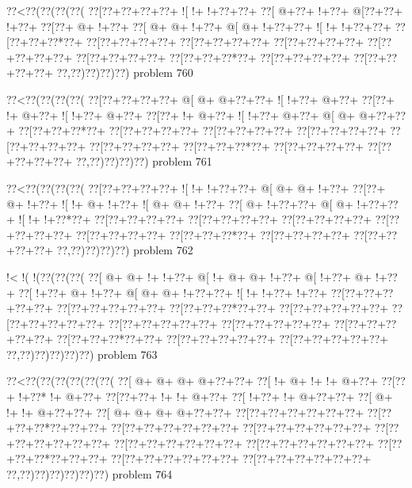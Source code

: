 \vbox{\vbox{\goo
\0??<\0??(\0??(\0??(\0??(
\0??[\0??+\0??+\0??+\0??+
\- ![\- !+\- !+\0??+\0??+
\0??[\- @+\0??+\- !+\0??+
\- @[\0??+\0??+\- !+\0??+
\0??[\0??+\- @+\- !+\0??+
\0??[\- @+\- @+\- !+\0??+
\- @[\- @+\- !+\0??+\0??+
\- ![\- !+\- !+\0??+\0??+
\0??[\0??+\0??+\0??*\0??+
\0??[\0??+\0??+\0??+\0??+
\0??[\0??+\0??+\0??+\0??+
\0??[\0??+\0??+\0??+\0??+
\0??[\0??+\0??+\0??+\0??+
\0??[\0??+\0??+\0??+\0??+
\0??[\0??+\0??+\0??*\0??+
\0??[\0??+\0??+\0??+\0??+
\0??[\0??+\0??+\0??+\0??+
\0??,\0??)\0??)\0??)\0??)
}
\hfil problem 760\hfil\break
}

\vbox{\vbox{\goo
\0??<\0??(\0??(\0??(\0??(
\0??[\0??+\0??+\0??+\0??+
\- @[\- @+\- @+\0??+\0??+
\- ![\- !+\0??+\- @+\0??+
\0??[\0??+\- !+\- @+\0??+
\- ![\- !+\0??+\- @+\0??+
\0??[\0??+\- !+\- @+\0??+
\- ![\- !+\0??+\- @+\0??+
\- @[\- @+\- @+\0??+\0??+
\0??[\0??+\0??+\0??*\0??+
\0??[\0??+\0??+\0??+\0??+
\0??[\0??+\0??+\0??+\0??+
\0??[\0??+\0??+\0??+\0??+
\0??[\0??+\0??+\0??+\0??+
\0??[\0??+\0??+\0??+\0??+
\0??[\0??+\0??+\0??*\0??+
\0??[\0??+\0??+\0??+\0??+
\0??[\0??+\0??+\0??+\0??+
\0??,\0??)\0??)\0??)\0??)
}
\hfil problem 761\hfil\break
}

\vbox{\vbox{\goo
\0??<\0??(\0??(\0??(\0??(
\0??[\0??+\0??+\0??+\0??+
\- ![\- !+\- !+\0??+\0??+
\- @[\- @+\- @+\- !+\0??+
\0??[\0??+\- @+\- !+\0??+
\- ![\- !+\- @+\- !+\0??+
\- ![\- @+\- @+\- !+\0??+
\0??[\- @+\- !+\0??+\0??+
\- @[\- @+\- !+\0??+\0??+
\- ![\- !+\- !+\0??*\0??+
\0??[\0??+\0??+\0??+\0??+
\0??[\0??+\0??+\0??+\0??+
\0??[\0??+\0??+\0??+\0??+
\0??[\0??+\0??+\0??+\0??+
\0??[\0??+\0??+\0??+\0??+
\0??[\0??+\0??+\0??*\0??+
\0??[\0??+\0??+\0??+\0??+
\0??[\0??+\0??+\0??+\0??+
\0??,\0??)\0??)\0??)\0??)
}
\hfil problem 762\hfil\break
}

\vbox{\vbox{\goo
\- !<\- !(\- !(\0??(\0??(\0??(
\0??[\- @+\- @+\- !+\- !+\0??+
\- @[\- !+\- @+\- @+\- !+\0??+
\- @[\- !+\0??+\- @+\- !+\0??+
\0??[\- !+\0??+\- @+\- !+\0??+
\- @[\- @+\- @+\- !+\0??+\0??+
\- ![\- !+\- !+\0??+\- !+\0??+
\0??[\0??+\0??+\0??+\0??+\0??+
\0??[\0??+\0??+\0??+\0??+\0??+
\0??[\0??+\0??+\0??*\0??+\0??+
\0??[\0??+\0??+\0??+\0??+\0??+
\0??[\0??+\0??+\0??+\0??+\0??+
\0??[\0??+\0??+\0??+\0??+\0??+
\0??[\0??+\0??+\0??+\0??+\0??+
\0??[\0??+\0??+\0??+\0??+\0??+
\0??[\0??+\0??+\0??*\0??+\0??+
\0??[\0??+\0??+\0??+\0??+\0??+
\0??[\0??+\0??+\0??+\0??+\0??+
\0??,\0??)\0??)\0??)\0??)\0??)
}
\hfil problem 763\hfil\break
}

\vbox{\vbox{\goo
\0??<\0??(\0??(\0??(\0??(\0??(\0??(
\0??[\- @+\- @+\- @+\- @+\0??+\0??+
\0??[\- !+\- @+\- !+\- !+\- @+\0??+
\0??[\0??+\- !+\0??*\- !+\- @+\0??+
\0??[\0??+\0??+\- !+\- !+\- @+\0??+
\0??[\- !+\0??+\- !+\- @+\0??+\0??+
\0??[\- @+\- !+\- !+\- @+\0??+\0??+
\0??[\- @+\- @+\- @+\- @+\0??+\0??+
\0??[\0??+\0??+\0??+\0??+\0??+\0??+
\0??[\0??+\0??+\0??*\0??+\0??+\0??+
\0??[\0??+\0??+\0??+\0??+\0??+\0??+
\0??[\0??+\0??+\0??+\0??+\0??+\0??+
\0??[\0??+\0??+\0??+\0??+\0??+\0??+
\0??[\0??+\0??+\0??+\0??+\0??+\0??+
\0??[\0??+\0??+\0??+\0??+\0??+\0??+
\0??[\0??+\0??+\0??*\0??+\0??+\0??+
\0??[\0??+\0??+\0??+\0??+\0??+\0??+
\0??[\0??+\0??+\0??+\0??+\0??+\0??+
\0??,\0??)\0??)\0??)\0??)\0??)\0??)
}
\hfil problem 764\hfil\break
}

